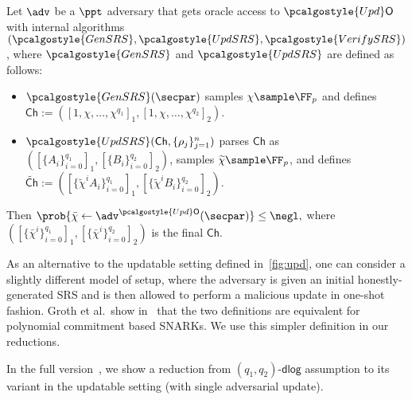 \documentclass[10pt]{llncs}
\renewcommand{\kgen}{\pcalgostyle{GenSRS}}
\newcommand{\upd}{\pcalgostyle{UpdSRS}}
\newcommand{\verifyCRS}{\pcalgostyle{VerifySRS}}
\newcommand{\initU}{\pcalgostyle{Upd}\oracleo}
\newcommand{\pcvarstyle}[1]{\mathsf{#1}}
\newcommand{\mhyph}{\text{-}}
\newcommand{\smallset}[1] {\{#1\}}
\newcommand{\bmap}[2] {\left[#1\right]_{#2}}
\newcommand{\gone}[1] {\bmap{#1}{1}}
\newcommand{\gtwo}[1] {\bmap{#1}{2}}
\newcommand{\oracleo}{\mathsf{O}}
\newcommand{\reduction}{\rdv}
\newcommand{\Ch}{\pcvarstyle{Ch}}
\newcommand{\dlog}{\pcvarstyle{dlog}}
\newcommand{\ldlog}{\pcvarstyle{ldlog}}
\newcommand{\udlog}{\pcvarstyle{udlog}}
\newcommand{\uldlog}{\pcvarstyle{uldlog}}
\begin{document}
\begin{definition}[$(q_1, q_2)\mhyph\udlog$ assumption]\label{def:udlog}
	Let $\adv$ be a $\ppt$ adversary that gets oracle access to $\initU$ with internal algorithms $(\kgen, \upd, \verifyCRS)$, where $\kgen$ and $\upd$ are defined as follows:
	\begin{itemize}
		\item $\kgen(\secpar)$ samples $\chi \sample \FF_p$ and defines 
		$\Ch:=(\gone{1, \chi, \ldots,
			\chi^{q_1}}, \gtwo{1, \chi, \ldots, \chi^{q_2}
		})$.
		\item $\upd(\Ch, \{\rho_j \}_{j=1}^n)$ 
		parses $\Ch$ as $\left( \gone{\smallset{A_i}_{i = 0}^{q_1}},
		\gtwo{\smallset{B_i}_{i = 0}^{q_2}} \right)$, samples
		$\widetilde{\chi} \sample \FF_p$, and defines
		$\widetilde{\Ch} := 
		\left( \gone{\smallset{\widetilde{\chi}^i A_i}_{i = 0}^{q_1}},
		\gtwo{\smallset{\widetilde{\chi}^i B_i}_{i = 0}^{q_2}} \right)$.
	\end{itemize}
	Then
	$
	\prob{\bar{\chi} \gets \adv^{\initU}(\secpar)} \leq \negl,
	$
	where $\left( \gone{\smallset{\bar{\chi}^i}_{i = 0}^{q_1}},
	\gtwo{\smallset{\bar{\chi}^i}_{i = 0}^{q_2}} \right)$ is the final $\Ch$.
\end{definition}



\begin{remark}\label{rem:upd}
	As an alternative to the updatable setting defined in~\cref{fig:upd}, one can consider a slightly different model of setup, where the adversary is given an initial honestly-generated SRS and is then allowed to perform a malicious update in one-shot fashion.
	Groth
	et al.\ show in~\cite{C:GKMMM18} that the two definitions are equivalent for polynomial commitment based SNARKs. We use this simpler definition in our reductions.
\end{remark}


In the full version~\cite{EPRINT:GKKNZ21}, we show a reduction from $(q_1, q_2)\mhyph\dlog$ assumption to its variant in the updatable setting (with single adversarial update). 
\end{document}
